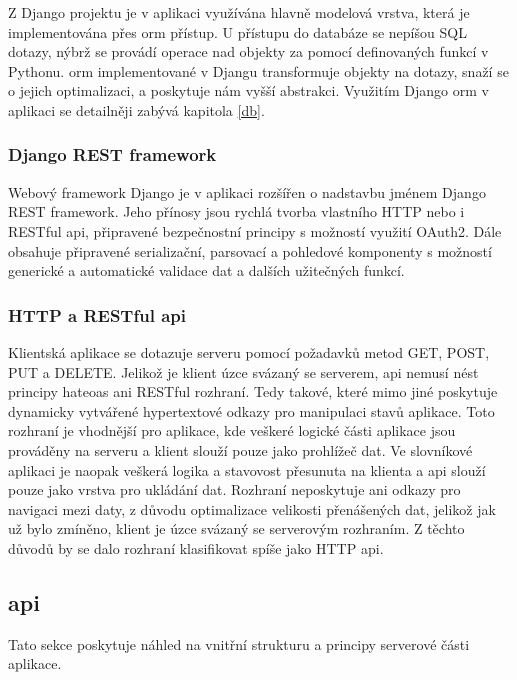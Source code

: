 \documentclass[a4paper,11pt,titlepage,fleqn]{article}
\begin{document}
            Z Django projektu je v aplikaci využívána hlavně modelová vrstva, která je implementována přes \gls{orm} přístup. U přístupu do databáze se nepíšou SQL dotazy, nýbrž se provádí operace nad objekty za pomocí definovaných funkcí v Pythonu. \gls{orm} implementované v Djangu transformuje objekty na dotazy, snaží se o jejich optimalizaci, a poskytuje nám vyšší abstrakci\cite{bib:django}. Využitím Django \gls{orm} v aplikaci se detailněji zabývá kapitola \ref{db}. 

        \subsubsection{Django REST framework}
            Webový framework Django je v aplikaci rozšířen o nadstavbu jménem Django REST framework. Jeho přínosy jsou rychlá tvorba vlastního HTTP nebo i RESTful \gls{api}, připravené bezpečnostní principy s možností využití OAuth2. Dále obsahuje připravené serializační, parsovací a pohledové komponenty s možností generické a automatické validace dat a dalších užitečných funkcí\cite{bib:django-rest}.

        \subsubsection{HTTP a RESTful \gls{api}}
            Klientská aplikace se dotazuje serveru pomocí požadavků metod GET, POST, PUT a DELETE. Jelikož je klient úzce svázaný se serverem, \gls{api} nemusí nést principy \gls{hateoas} ani RESTful rozhraní. Tedy takové, které mimo jiné poskytuje dynamicky vytvářené hypertextové odkazy pro manipulaci stavů aplikace. Toto rozhraní je vhodnější pro aplikace, kde veškeré logické části aplikace jsou prováděny na serveru a klient slouží pouze jako prohlížeč dat. Ve slovníkové aplikaci je naopak veškerá logika a stavovost přesunuta na klienta a \gls{api} slouží pouze jako vrstva pro ukládání dat. Rozhraní neposkytuje ani odkazy pro navigaci mezi daty, z důvodu optimalizace velikosti přenášených dat, jelikož jak už bylo zmíněno, klient je úzce svázaný se serverovým rozhraním. Z těchto důvodů by se dalo rozhraní klasifikovat spíše jako HTTP \gls{api}.

    \subsection{\gls{api}}
        Tato sekce poskytuje náhled na vnitřní strukturu a principy serverové části aplikace. 
\end{document}
